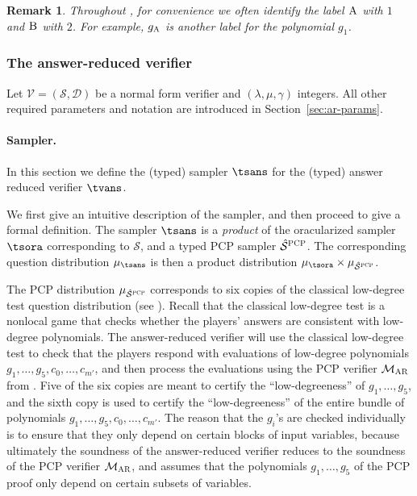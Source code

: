\documentclass[11pt]{article}
\newtheorem{remark}[theorem]{Remark}
\theoremstyle{definition}
\newcommand{\sampler}{\mathcal{S}}
\newcommand{\decider}{\mathcal{D}}
\newcommand{\verifier}{\mathcal{V}}
\newcommand{\gamestyle}[1]{\ensuremath{\textsc{#1}}\xspace}
\newcommand{\pcp}{\gamestyle{PCP}}
\newcommand{\ar}{\gamestyle{AR}}
\newcommand{\labelstyle}[1]{\ensuremath{\textsc{#1}}\xspace}
\newcommand{\alice}{\labelstyle{A}}
\newcommand{\bob}{\labelstyle{B}}
\newcommand{\pcpverifier}{\mathcal{M}_\ar}
\begin{document}
\begin{remark}\label{rk:ab-01}
  Throughout , for convenience we often identify the label
  $\alice$ with $1$ and $\bob$ with $2$.
  For example, $g_\alice$ is another label for the polynomial $g_1$.
\end{remark}

\subsubsection{The answer-reduced verifier}
\label{sec:ar-verifier}

Let $\verifier = (\sampler, \decider)$ be a normal form verifier and
$(\lambda,\mu,\gamma)$ integers.
All other required parameters and notation are introduced in
Section~\ref{sec:ar-params}.

\newcommand{\tspcp}{\hat{\sampler}^\pcp}

\paragraph{Sampler.}
In this section we define the (typed) sampler $\tsans$ for the (typed) answer reduced
verifier $\tvans$. 

We first give an intuitive description of the sampler, and then proceed to give
a formal definition.
The sampler $\tsans$ is a \emph{product} of the oracularized sampler $\tsora$
corresponding to $\sampler$, and a typed PCP sampler $\tspcp$.
The corresponding question distribution $\mu_{\tsans}$ is then a product
distribution $\mu_{\tsora} \times \mu_{\tspcp}$.

The PCP distribution $\mu_{\tspcp}$ corresponds to six copies of the classical
low-degree test question distribution (see ).
Recall that the classical low-degree test is a nonlocal game that checks whether
the players' answers are consistent with low-degree polynomials.
The answer-reduced verifier will use the classical low-degree test to check that
the players respond with evaluations of low-degree polynomials
$g_1,\ldots,g_5,c_0,\ldots,c_{m'}$, and then process the evaluations using the
PCP verifier $\pcpverifier$ from .
Five of the six copies are meant to certify the ``low-degreeness'' of
$g_1,\ldots,g_5$, and the sixth copy is used to certify the ``low-degreeness''
of the entire bundle of polynomials $g_1,\ldots,g_5,c_0,\ldots,c_{m'}$.
The reason that the $g_i$'s are checked individually is to ensure that they only
depend on certain blocks of input variables, because ultimately the soundness of
the answer-reduced verifier reduces to the soundness of the PCP verifier
$\pcpverifier$, and  assumes that the polynomials
$g_1,\ldots,g_5$ of the PCP proof only depend on certain subsets of variables.
\end{document}
